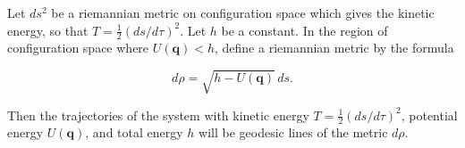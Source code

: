 Let $ds^2$ be a riemannian metric on configuration space which gives the kinetic energy, so that $T = \frac{1}{2}(ds/d\tau)^2$. Let $h$ be a constant. In the region of configuration space where $U(\mathbf{q}) < h$, define a riemannian metric by the formula

$$d\rho = \sqrt{h - U(\mathbf{q})} \, ds.$$

Then the trajectories of the system with kinetic energy $T = \frac{1}{2}(ds/d\tau)^2$, potential energy $U(\mathbf{q})$, and total energy $h$ will be geodesic lines of the metric $d\rho$.
